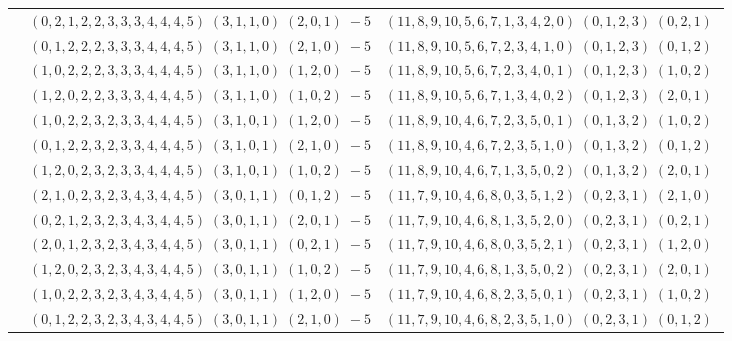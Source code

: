 \documentclass[11pt]{article}
\begin{document}
\begin{longtable}[l]{|c|c|c|}
 \cline{2-3} 
 & $(0 ,2 ,1 ,2 ,2 ,3 ,3 ,3 ,4 ,4 ,4 ,5) \;(3 ,1 ,1 ,0) \;(2 ,0 ,1) \;-5$ & $(11 ,8 ,9 ,10 ,5 ,6 ,7 ,1 ,3 ,4 ,2 ,0) \;(0 ,1 ,2 ,3) \;(0 ,2 ,1) \;$\\ 
 \cline{2-3} 
 & $(0 ,1 ,2 ,2 ,2 ,3 ,3 ,3 ,4 ,4 ,4 ,5) \;(3 ,1 ,1 ,0) \;(2 ,1 ,0) \;-5$ & $(11 ,8 ,9 ,10 ,5 ,6 ,7 ,2 ,3 ,4 ,1 ,0) \;(0 ,1 ,2 ,3) \;(0 ,1 ,2) \;$\\ 
 \cline{2-3} 
 & $(1 ,0 ,2 ,2 ,2 ,3 ,3 ,3 ,4 ,4 ,4 ,5) \;(3 ,1 ,1 ,0) \;(1 ,2 ,0) \;-5$ & $(11 ,8 ,9 ,10 ,5 ,6 ,7 ,2 ,3 ,4 ,0 ,1) \;(0 ,1 ,2 ,3) \;(1 ,0 ,2) \;$\\ 
 \cline{2-3} 
 & $(1 ,2 ,0 ,2 ,2 ,3 ,3 ,3 ,4 ,4 ,4 ,5) \;(3 ,1 ,1 ,0) \;(1 ,0 ,2) \;-5$ & $(11 ,8 ,9 ,10 ,5 ,6 ,7 ,1 ,3 ,4 ,0 ,2) \;(0 ,1 ,2 ,3) \;(2 ,0 ,1) \;$\\ 
 \cline{2-3} 
 & $(1 ,0 ,2 ,2 ,3 ,2 ,3 ,3 ,4 ,4 ,4 ,5) \;(3 ,1 ,0 ,1) \;(1 ,2 ,0) \;-5$ & $(11 ,8 ,9 ,10 ,4 ,6 ,7 ,2 ,3 ,5 ,0 ,1) \;(0 ,1 ,3 ,2) \;(1 ,0 ,2) \;$\\ 
 \cline{2-3} 
 & $(0 ,1 ,2 ,2 ,3 ,2 ,3 ,3 ,4 ,4 ,4 ,5) \;(3 ,1 ,0 ,1) \;(2 ,1 ,0) \;-5$ & $(11 ,8 ,9 ,10 ,4 ,6 ,7 ,2 ,3 ,5 ,1 ,0) \;(0 ,1 ,3 ,2) \;(0 ,1 ,2) \;$\\ 
 \cline{2-3} 
 & $(1 ,2 ,0 ,2 ,3 ,2 ,3 ,3 ,4 ,4 ,4 ,5) \;(3 ,1 ,0 ,1) \;(1 ,0 ,2) \;-5$ & $(11 ,8 ,9 ,10 ,4 ,6 ,7 ,1 ,3 ,5 ,0 ,2) \;(0 ,1 ,3 ,2) \;(2 ,0 ,1) \;$\\ 
 \cline{2-3} 
 & $(2 ,1 ,0 ,2 ,3 ,2 ,3 ,4 ,3 ,4 ,4 ,5) \;(3 ,0 ,1 ,1) \;(0 ,1 ,2) \;-5$ & $(11 ,7 ,9 ,10 ,4 ,6 ,8 ,0 ,3 ,5 ,1 ,2) \;(0 ,2 ,3 ,1) \;(2 ,1 ,0) \;$\\ 
 \cline{2-3} 
 & $(0 ,2 ,1 ,2 ,3 ,2 ,3 ,4 ,3 ,4 ,4 ,5) \;(3 ,0 ,1 ,1) \;(2 ,0 ,1) \;-5$ & $(11 ,7 ,9 ,10 ,4 ,6 ,8 ,1 ,3 ,5 ,2 ,0) \;(0 ,2 ,3 ,1) \;(0 ,2 ,1) \;$\\ 
 \cline{2-3} 
 & $(2 ,0 ,1 ,2 ,3 ,2 ,3 ,4 ,3 ,4 ,4 ,5) \;(3 ,0 ,1 ,1) \;(0 ,2 ,1) \;-5$ & $(11 ,7 ,9 ,10 ,4 ,6 ,8 ,0 ,3 ,5 ,2 ,1) \;(0 ,2 ,3 ,1) \;(1 ,2 ,0) \;$\\ 
 \cline{2-3} 
 & $(1 ,2 ,0 ,2 ,3 ,2 ,3 ,4 ,3 ,4 ,4 ,5) \;(3 ,0 ,1 ,1) \;(1 ,0 ,2) \;-5$ & $(11 ,7 ,9 ,10 ,4 ,6 ,8 ,1 ,3 ,5 ,0 ,2) \;(0 ,2 ,3 ,1) \;(2 ,0 ,1) \;$\\ 
 \cline{2-3} 
 & $(1 ,0 ,2 ,2 ,3 ,2 ,3 ,4 ,3 ,4 ,4 ,5) \;(3 ,0 ,1 ,1) \;(1 ,2 ,0) \;-5$ & $(11 ,7 ,9 ,10 ,4 ,6 ,8 ,2 ,3 ,5 ,0 ,1) \;(0 ,2 ,3 ,1) \;(1 ,0 ,2) \;$\\ 
 \cline{2-3} 
 & $(0 ,1 ,2 ,2 ,3 ,2 ,3 ,4 ,3 ,4 ,4 ,5) \;(3 ,0 ,1 ,1) \;(2 ,1 ,0) \;-5$ & $(11 ,7 ,9 ,10 ,4 ,6 ,8 ,2 ,3 ,5 ,1 ,0) \;(0 ,2 ,3 ,1) \;(0 ,1 ,2) \;$\\ 

\end{longtable}
\end{document}
